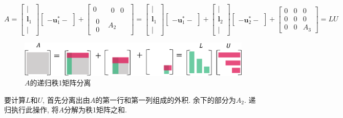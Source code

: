 \documentclass[letterpaper]{article}
\begin{document}
\begin{equation*}
  A = 
      \begin{bmatrix}
        |\\
        \bm{l}_1\\
        |
      \end{bmatrix}
      \begin{bmatrix}
        -  \bm{u}^*_1  -
      \end{bmatrix}
  +  \begin{bmatrix}
      0 & \begin{matrix} 0 & 0 \end{matrix}\\
      \begin{matrix} 0 \\ 0 \end{matrix} & A_2
    \end{bmatrix}
  = 
  \begin{bmatrix}
    |\\
    \bm{l}_1\\
    |
  \end{bmatrix}
  \begin{bmatrix}
    - \bm{u}^*_1 -
  \end{bmatrix}
  +
  \begin{bmatrix}
    |\\
    \bm{l}_2\\
    |
  \end{bmatrix}
  \begin{bmatrix}
    - \bm{u}^*_2  -
  \end{bmatrix}
  +  \begin{bmatrix}
  0 & 0 & 0\\
  0 & 0 & 0 \\
  0 & 0 & A_3
  \end{bmatrix} = LU
\end{equation*}
 

\begin{figure}[H]
  \centering
  \includegraphics[scale=0.8]{LU1.eps}
\caption{$A$的递归秩1矩阵分离}
\end{figure}

要计算$L$和$U$, 首先分离出由$A$的第一行和第一列组成的外积. 
余下的部分为$A_2$. 
递归执行此操作, 将$A$分解为秩1矩阵之和. 
\end{document}
